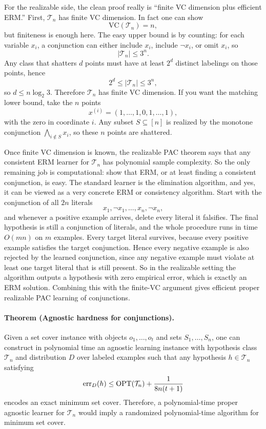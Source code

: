 For the realizable side, the clean proof really is ``finite VC dimension plus efficient ERM.'' First, $\mathcal{T}_n$ has finite VC dimension. In fact one can show
\[
\mathrm{VC}(\mathcal{T}_n)=n,
\]
but finiteness is enough here. The easy upper bound is by counting: for each variable $x_i$, a conjunction can either include $x_i$, include $\neg x_i$, or omit $x_i$, so
\[
|\mathcal{T}_n| \le 3^n.
\]
Any class that shatters $d$ points must have at least $2^d$ distinct labelings on those points, hence
\[
2^d \le |\mathcal{T}_n| \le 3^n,
\]
so $d \le n \log_2 3$. Therefore $\mathcal{T}_n$ has finite VC dimension. If you want the matching lower bound, take the $n$ points
\[
x^{(i)} = (1,\dots,1,0,1,\dots,1),
\]
with the zero in coordinate $i$. Any subset $S \subseteq [n]$ is realized by the monotone conjunction $\bigwedge_{i \notin S} x_i$, so these $n$ points are shattered.

Once finite VC dimension is known, the realizable PAC theorem says that any consistent ERM learner for $\mathcal{T}_n$ has polynomial sample complexity. So the only remaining job is computational: show that ERM, or at least finding a consistent conjunction, is easy. The standard learner is the elimination algorithm, and yes, it can be viewed as a very concrete ERM or consistency algorithm. Start with the conjunction of all $2n$ literals
\[
x_1,\neg x_1,\dots,x_n,\neg x_n,
\]
and whenever a positive example arrives, delete every literal it falsifies. The final hypothesis is still a conjunction of literals, and the whole procedure runs in time $O(mn)$ on $m$ examples. Every target literal survives, because every positive example satisfies the target conjunction. Hence every negative example is also rejected by the learned conjunction, since any negative example must violate at least one target literal that is still present. So in the realizable setting the algorithm outputs a hypothesis with zero empirical error, which is exactly an ERM solution. Combining this with the finite-VC argument gives efficient proper realizable PAC learning of conjunctions.

\paragraph{Theorem (Agnostic hardness for conjunctions).}
Given a set cover instance with objects $o_1,\dots,o_t$ and sets $S_1,\dots,S_n$, one can construct in polynomial time an agnostic learning instance with hypothesis class $\mathcal{T}_n$ and distribution $D$ over labeled examples such that any hypothesis $h \in \mathcal{T}_n$ satisfying
\[
\operatorname{err}_D(h)\le \operatorname{OPT}(\mathcal{T}_n)+\frac{1}{8n(t+1)}
\]
encodes an exact minimum set cover. Therefore, a polynomial-time proper agnostic learner for $\mathcal{T}_n$ would imply a randomized polynomial-time algorithm for minimum set cover.

